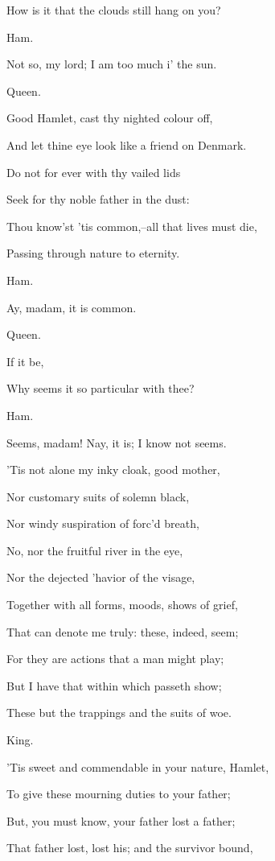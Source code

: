 \documentclass[12pt]{book}
\begin{document}
How is it that the clouds still hang on you?



Ham.

Not so, my lord; I am too much i' the sun.



Queen.

Good Hamlet, cast thy nighted colour off,

And let thine eye look like a friend on Denmark.

Do not for ever with thy vailed lids

Seek for thy noble father in the dust:

Thou know'st 'tis common,--all that lives must die,

Passing through nature to eternity.



Ham.

Ay, madam, it is common.



Queen.

If it be,

Why seems it so particular with thee?



Ham.

Seems, madam! Nay, it is; I know not seems.

'Tis not alone my inky cloak, good mother,

Nor customary suits of solemn black,

Nor windy suspiration of forc'd breath,

No, nor the fruitful river in the eye,

Nor the dejected 'havior of the visage,

Together with all forms, moods, shows of grief,

That can denote me truly: these, indeed, seem;

For they are actions that a man might play;

But I have that within which passeth show;

These but the trappings and the suits of woe.



King.

'Tis sweet and commendable in your nature, Hamlet,

To give these mourning duties to your father;

But, you must know, your father lost a father;

That father lost, lost his; and the survivor bound,
\end{document}
